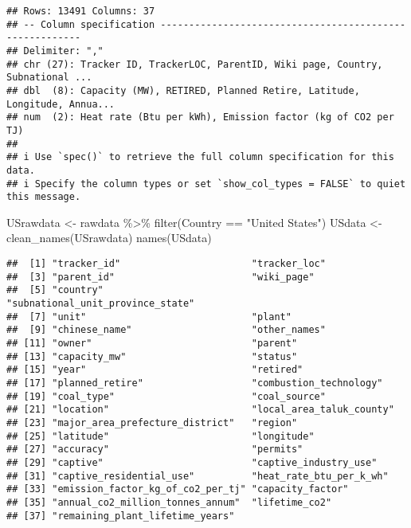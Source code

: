 \documentclass[
]{article}
\newenvironment{Shaded}{\begin{snugshade}}{\end{snugshade}}
\newcommand{\FunctionTok}[1]{\textcolor[rgb]{0.00,0.00,0.00}{#1}}
\newcommand{\NormalTok}[1]{#1}
\newcommand{\OtherTok}[1]{\textcolor[rgb]{0.56,0.35,0.01}{#1}}
\newcommand{\SpecialCharTok}[1]{\textcolor[rgb]{0.00,0.00,0.00}{#1}}
\newcommand{\StringTok}[1]{\textcolor[rgb]{0.31,0.60,0.02}{#1}}
\begin{document}
\begin{verbatim}
## Rows: 13491 Columns: 37
## -- Column specification --------------------------------------------------------
## Delimiter: ","
## chr (27): Tracker ID, TrackerLOC, ParentID, Wiki page, Country, Subnational ...
## dbl  (8): Capacity (MW), RETIRED, Planned Retire, Latitude, Longitude, Annua...
## num  (2): Heat rate (Btu per kWh), Emission factor (kg of CO2 per TJ)
## 
## i Use `spec()` to retrieve the full column specification for this data.
## i Specify the column types or set `show_col_types = FALSE` to quiet this message.
\end{verbatim}

\begin{Shaded}
\begin{Highlighting}[]
\NormalTok{USrawdata }\OtherTok{\textless{}{-}}\NormalTok{ rawdata }\SpecialCharTok{\%\textgreater{}\%} \FunctionTok{filter}\NormalTok{(Country }\SpecialCharTok{==} \StringTok{"United States"}\NormalTok{)}
\NormalTok{USdata }\OtherTok{\textless{}{-}} \FunctionTok{clean\_names}\NormalTok{(USrawdata)}
\FunctionTok{names}\NormalTok{(USdata)}
\end{Highlighting}
\end{Shaded}

\begin{verbatim}
##  [1] "tracker_id"                       "tracker_loc"                     
##  [3] "parent_id"                        "wiki_page"                       
##  [5] "country"                          "subnational_unit_province_state" 
##  [7] "unit"                             "plant"                           
##  [9] "chinese_name"                     "other_names"                     
## [11] "owner"                            "parent"                          
## [13] "capacity_mw"                      "status"                          
## [15] "year"                             "retired"                         
## [17] "planned_retire"                   "combustion_technology"           
## [19] "coal_type"                        "coal_source"                     
## [21] "location"                         "local_area_taluk_county"         
## [23] "major_area_prefecture_district"   "region"                          
## [25] "latitude"                         "longitude"                       
## [27] "accuracy"                         "permits"                         
## [29] "captive"                          "captive_industry_use"            
## [31] "captive_residential_use"          "heat_rate_btu_per_k_wh"          
## [33] "emission_factor_kg_of_co2_per_tj" "capacity_factor"                 
## [35] "annual_co2_million_tonnes_annum"  "lifetime_co2"                    
## [37] "remaining_plant_lifetime_years"
\end{verbatim}
\end{document}
